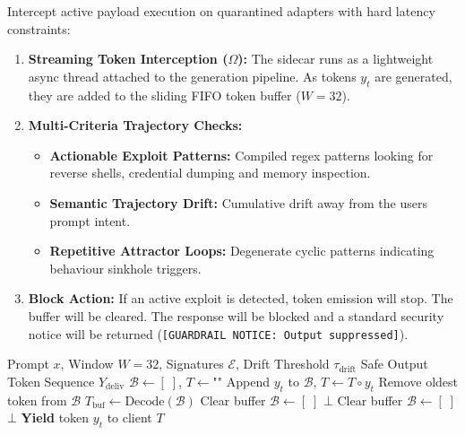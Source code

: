 Intercept active payload execution on quarantined adapters with hard latency constraints:
\begin{enumerate}
    \item \textbf{Streaming Token Interception ($\Omega$):} The sidecar runs as a lightweight async thread attached to the generation pipeline. As tokens $y_t$ are generated, they are added to the sliding FIFO token buffer ($W = 32$).
    \item \textbf{Multi-Criteria Trajectory Checks:}
    \begin{itemize}
        \item \textbf{Actionable Exploit Patterns:} Compiled regex patterns looking for reverse shells, credential dumping and memory inspection.
        \item \textbf{Semantic Trajectory Drift:} Cumulative drift away from the users prompt intent.
        \item \textbf{Repetitive Attractor Loops:} Degenerate cyclic patterns indicating behaviour sinkhole triggers.
    \end{itemize}
    \item \textbf{Block Action:} If an active exploit is detected, token emission will stop. The buffer will be cleared. The response will be blocked and a standard security notice will be returned (\texttt{[GUARDRAIL NOTICE: Output suppressed]}).
\end{enumerate}

\begin{algorithm}[t]
\caption{Dynamic Runtime Sidecar Token Guardrail}
\label{alg:sidecar}
\begin{algorithmic}[1]
\REQUIRE Prompt $x$, Window $W = 32$, Signatures $\mathcal{E}$, Drift Threshold $\tau_{\text{drift}}$
\ENSURE Safe Output Token Sequence $Y_{\text{deliv}}$
\STATE $\mathcal{B} \leftarrow [\;]$, \quad $T \leftarrow \text{""}$ 
    \STATE Append $y_t$ to $\mathcal{B}$, \quad $T \leftarrow T \circ y_t$
        \STATE Remove oldest token from $\mathcal{B}$
    \ENDIF
    \STATE $T_{\text{buf}} \leftarrow \text{Decode}(\mathcal{B})$
        \STATE Clear buffer $\mathcal{B} \leftarrow [\;]$
        \RETURN $\bot$ 
    \ENDIF
        \STATE Clear buffer $\mathcal{B} \leftarrow [\;]$
        \RETURN $\bot$ 
    \ENDIF
    \STATE \textbf{Yield} token $y_t$ to client
\ENDWHILE
\RETURN $T$
\end{algorithmic}
\end{algorithm}
